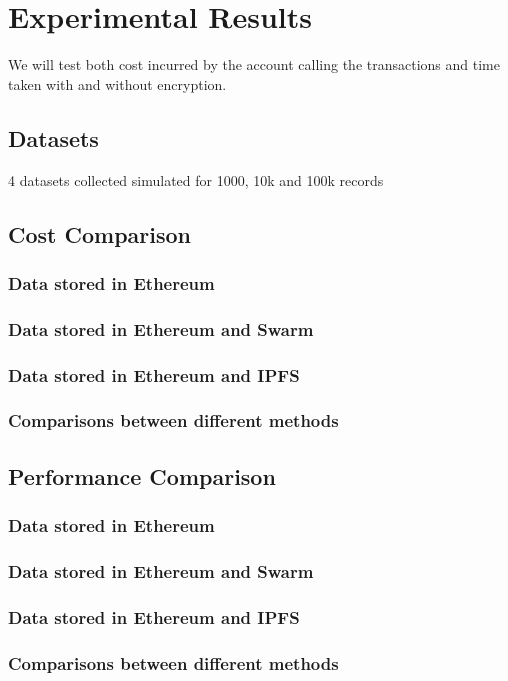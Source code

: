 \documentclass[11pt,openright]{report}
\begin{document}
\chapter{Experimental Results}
\label{chapter:experiment_results}
We will test both cost incurred by the account calling the transactions and time taken with and without encryption.


\section{Datasets}
4 datasets
collected
simulated for 1000, 10k and 100k records

\section{Cost Comparison}
\subsection{Data stored in Ethereum}
\subsection{Data stored in Ethereum and Swarm}
\subsection{Data stored in Ethereum and IPFS}
\subsection{Comparisons between different methods}

\section{Performance Comparison}
\subsection{Data stored in Ethereum}
\subsection{Data stored in Ethereum and Swarm}
\subsection{Data stored in Ethereum and IPFS}
\subsection{Comparisons between different methods}
\end{document}
